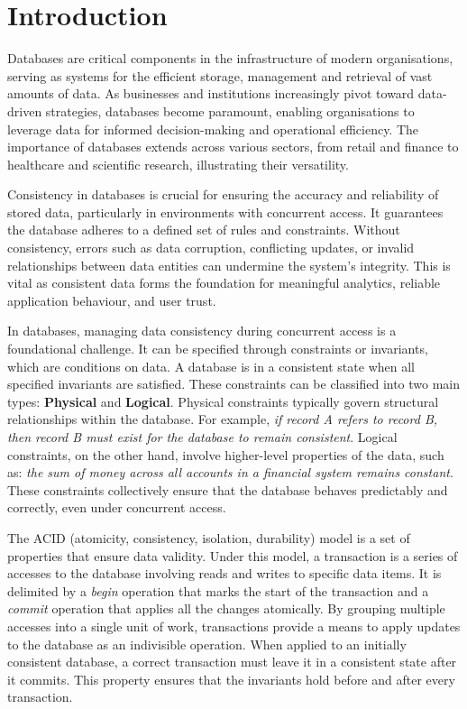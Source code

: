 %

\chapter{Introduction} \label{chap:intro}
\adjustmtc

Databases are critical components in the infrastructure of modern organisations, serving as systems for the efficient storage, management and retrieval of vast amounts of data. As businesses and institutions increasingly pivot toward data-driven strategies, databases become paramount, enabling organisations to leverage data for informed decision-making and operational efficiency. The importance of databases extends across various sectors, from retail and finance to healthcare and scientific research, illustrating their versatility.


Consistency in databases is crucial for ensuring the accuracy and reliability of stored data, particularly in environments with concurrent access. It guarantees the database adheres to a defined set of rules and constraints. Without consistency, errors such as data corruption, conflicting updates, or invalid relationships between data entities can undermine the system's integrity. This is vital as consistent data forms the foundation for meaningful analytics, reliable application behaviour, and user trust.

In databases, managing data consistency during concurrent access is a foundational challenge. It can be specified through constraints or invariants, which are conditions on data. A database is in a consistent state when all specified invariants are satisfied. These constraints can be classified into two main types: \textbf{Physical} and \textbf{Logical}. Physical constraints typically govern structural relationships within the database. For example, \emph{if record A refers to record B, then record B must exist for the database to remain consistent}. Logical constraints, on the other hand, involve higher-level properties of the data, such as: \emph{the sum of money across all accounts in a financial system remains constant}. These constraints collectively ensure that the database behaves predictably and correctly, even under concurrent access.

The ACID (atomicity, consistency, isolation, durability) model is a set of properties that ensure data validity. Under this model, a transaction is a series of accesses to the database involving reads and writes to specific data items. It is delimited by a \emph{begin} operation that marks the start of the transaction and a \emph{commit} operation that applies all the changes atomically. By grouping multiple accesses into a single unit of work, transactions provide a means to apply updates to the database as an indivisible operation. When applied to an initially consistent database, a correct transaction must leave it in a consistent state after it commits. This property ensures that the invariants hold before and after every transaction.

